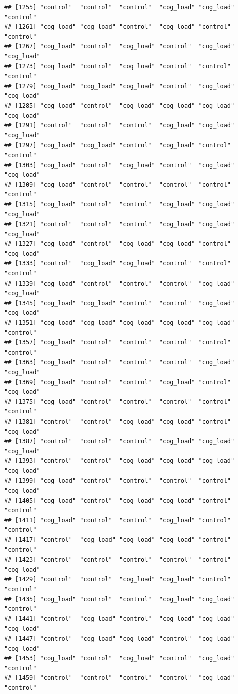 \documentclass[
  american,
  man,floatsintext]{apa7}
\begin{document}
\begin{verbatim}
## [1255] "control"  "control"  "control"  "cog_load" "cog_load" "control" 
## [1261] "cog_load" "cog_load" "control"  "cog_load" "control"  "control" 
## [1267] "cog_load" "control"  "cog_load" "control"  "cog_load" "cog_load"
## [1273] "cog_load" "control"  "cog_load" "control"  "control"  "control" 
## [1279] "cog_load" "cog_load" "cog_load" "control"  "cog_load" "cog_load"
## [1285] "cog_load" "control"  "cog_load" "cog_load" "cog_load" "cog_load"
## [1291] "control"  "control"  "control"  "cog_load" "cog_load" "cog_load"
## [1297] "cog_load" "cog_load" "control"  "cog_load" "control"  "control" 
## [1303] "cog_load" "control"  "cog_load" "control"  "cog_load" "cog_load"
## [1309] "cog_load" "control"  "control"  "control"  "control"  "control" 
## [1315] "cog_load" "control"  "control"  "cog_load" "cog_load" "cog_load"
## [1321] "control"  "control"  "control"  "cog_load" "cog_load" "cog_load"
## [1327] "cog_load" "control"  "cog_load" "cog_load" "control"  "cog_load"
## [1333] "control"  "cog_load" "cog_load" "control"  "control"  "control" 
## [1339] "cog_load" "control"  "control"  "control"  "cog_load" "cog_load"
## [1345] "cog_load" "cog_load" "control"  "control"  "cog_load" "cog_load"
## [1351] "cog_load" "cog_load" "cog_load" "cog_load" "cog_load" "control" 
## [1357] "cog_load" "control"  "control"  "control"  "control"  "control" 
## [1363] "cog_load" "control"  "control"  "control"  "cog_load" "cog_load"
## [1369] "cog_load" "control"  "control"  "cog_load" "control"  "cog_load"
## [1375] "cog_load" "control"  "control"  "control"  "control"  "control" 
## [1381] "control"  "control"  "cog_load" "cog_load" "control"  "cog_load"
## [1387] "control"  "control"  "control"  "cog_load" "cog_load" "cog_load"
## [1393] "control"  "control"  "cog_load" "cog_load" "cog_load" "cog_load"
## [1399] "cog_load" "control"  "control"  "control"  "control"  "cog_load"
## [1405] "cog_load" "control"  "cog_load" "cog_load" "control"  "control" 
## [1411] "cog_load" "control"  "control"  "cog_load" "control"  "control" 
## [1417] "control"  "cog_load" "cog_load" "cog_load" "control"  "control" 
## [1423] "control"  "control"  "control"  "control"  "control"  "cog_load"
## [1429] "control"  "control"  "cog_load" "cog_load" "control"  "control" 
## [1435] "cog_load" "control"  "control"  "cog_load" "cog_load" "control" 
## [1441] "control"  "cog_load" "control"  "cog_load" "cog_load" "cog_load"
## [1447] "control"  "cog_load" "cog_load" "control"  "cog_load" "cog_load"
## [1453] "cog_load" "control"  "cog_load" "control"  "cog_load" "control" 
## [1459] "control"  "control"  "control"  "control"  "cog_load" "control" 

\end{verbatim}
\end{document}
